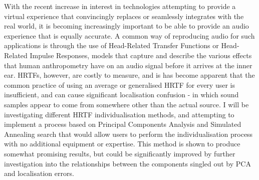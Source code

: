 With the recent increase in interest in technologies attempting to provide a virtual experience that convincingly replaces or seamlessly integrates with the real world, it is becoming increasingly important to be able to provide an audio experience that is equally accurate. A common way of reproducing audio for such applications is through the use of Head-Related Transfer Functions or Head-Related Impulse Responses, models that capture and describe the various effects that human anthropometry have on an audio signal before it arrives at the inner ear. HRTFs, however, are costly to measure, and is has become apparent that the common practice of using an average or generalised HRTF for every user is insufficient, and can cause significant localisation confusion - in which sound samples appear to come from somewhere other than the actual source. I will be investigating different HRTF individualisation methods, and attempting to implement a process based on Principal Components Analysis and Simulated Annealing search that would allow users to perform the individualisation process with no additional equipment or expertise. This method is shown to produce somewhat promising results, but could be significantly improved by further investigation into the relationships between the components singled out by PCA and localisation errors. 